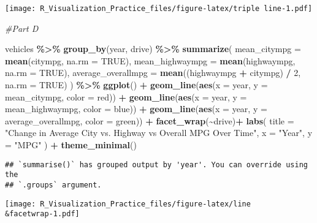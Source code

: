 \documentclass[
]{article}
\newenvironment{Shaded}{\begin{snugshade}}{\end{snugshade}}
\newcommand{\AttributeTok}[1]{\textcolor[rgb]{0.13,0.29,0.53}{#1}}
\newcommand{\CommentTok}[1]{\textcolor[rgb]{0.56,0.35,0.01}{\textit{#1}}}
\newcommand{\ConstantTok}[1]{\textcolor[rgb]{0.56,0.35,0.01}{#1}}
\newcommand{\DecValTok}[1]{\textcolor[rgb]{0.00,0.00,0.81}{#1}}
\newcommand{\FunctionTok}[1]{\textcolor[rgb]{0.13,0.29,0.53}{\textbf{#1}}}
\newcommand{\NormalTok}[1]{#1}
\newcommand{\SpecialCharTok}[1]{\textcolor[rgb]{0.81,0.36,0.00}{\textbf{#1}}}
\newcommand{\StringTok}[1]{\textcolor[rgb]{0.31,0.60,0.02}{#1}}
\begin{document}
\texttt{[image: R\_Visualization\_Practice\_files/figure-latex/triple line-1.pdf]}

\begin{Shaded}
\begin{Highlighting}[]
\CommentTok{\#Part D}


\NormalTok{vehicles }\SpecialCharTok{\%\textgreater{}\%}
  \FunctionTok{group\_by}\NormalTok{(year, drive) }\SpecialCharTok{\%\textgreater{}\%}
  \FunctionTok{summarize}\NormalTok{(}
    \AttributeTok{mean\_citympg =} \FunctionTok{mean}\NormalTok{(citympg, }\AttributeTok{na.rm =} \ConstantTok{TRUE}\NormalTok{),}
    \AttributeTok{mean\_highwaympg =} \FunctionTok{mean}\NormalTok{(highwaympg, }\AttributeTok{na.rm =} \ConstantTok{TRUE}\NormalTok{),}
    \AttributeTok{average\_overallmpg =} \FunctionTok{mean}\NormalTok{((highwaympg }\SpecialCharTok{+}\NormalTok{ citympg) }\SpecialCharTok{/} \DecValTok{2}\NormalTok{, }\AttributeTok{na.rm =} \ConstantTok{TRUE}\NormalTok{)}
\NormalTok{  ) }\SpecialCharTok{\%\textgreater{}\%}
  \FunctionTok{ggplot}\NormalTok{() }\SpecialCharTok{+}
  \FunctionTok{geom\_line}\NormalTok{(}\FunctionTok{aes}\NormalTok{(}\AttributeTok{x =}\NormalTok{ year, }\AttributeTok{y =}\NormalTok{ mean\_citympg, }\AttributeTok{color =} \StringTok{\textquotesingle{}red\textquotesingle{}}\NormalTok{)) }\SpecialCharTok{+}
  \FunctionTok{geom\_line}\NormalTok{(}\FunctionTok{aes}\NormalTok{(}\AttributeTok{x =}\NormalTok{ year, }\AttributeTok{y =}\NormalTok{ mean\_highwaympg, }\AttributeTok{color =} \StringTok{\textquotesingle{}blue\textquotesingle{}}\NormalTok{)) }\SpecialCharTok{+}
  \FunctionTok{geom\_line}\NormalTok{(}\FunctionTok{aes}\NormalTok{(}\AttributeTok{x =}\NormalTok{ year, }\AttributeTok{y =}\NormalTok{ average\_overallmpg, }\AttributeTok{color =} \StringTok{\textquotesingle{}green\textquotesingle{}}\NormalTok{)) }\SpecialCharTok{+}
  \FunctionTok{facet\_wrap}\NormalTok{(}\SpecialCharTok{\textasciitilde{}}\NormalTok{drive)}\SpecialCharTok{+}
  \FunctionTok{labs}\NormalTok{(}
    \AttributeTok{title =} \StringTok{"Change in Average City vs. Highway vs Overall MPG Over Time"}\NormalTok{,}
    \AttributeTok{x =} \StringTok{"Year"}\NormalTok{,}
    \AttributeTok{y =} \StringTok{"MPG"}
\NormalTok{  ) }\SpecialCharTok{+}
  \FunctionTok{theme\_minimal}\NormalTok{()}
\end{Highlighting}
\end{Shaded}

\begin{verbatim}
## `summarise()` has grouped output by 'year'. You can override using the
## `.groups` argument.
\end{verbatim}

\texttt{[image: R\_Visualization\_Practice\_files/figure-latex/line\\\&facetwrap-1.pdf]}
\end{document}
